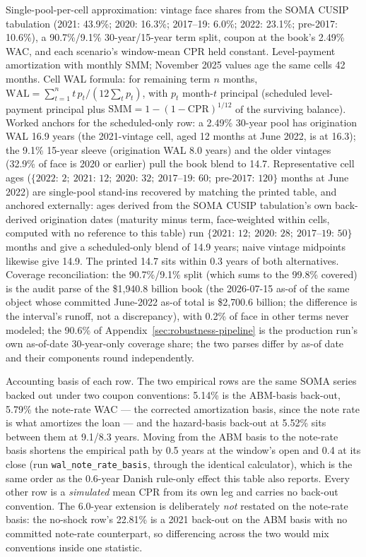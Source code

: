 \begin{table}[H]
\begin{threeparttable}
\begin{tablenotes}[flushleft]
\item Single-pool-per-cell approximation: vintage face shares from the SOMA CUSIP tabulation (2021: 43.9\%; 2020: 16.3\%; 2017--19: 6.0\%; 2022: 23.1\%; pre-2017: 10.6\%), a 90.7\%/9.1\% 30-year/15-year term split, coupon at the book's 2.49\% WAC, and each scenario's window-mean CPR held constant. Level-payment amortization with monthly SMM; November 2025 values age the same cells 42 months. Cell WAL formula: for remaining term $n$ months, $\mathrm{WAL} = \sum_{t=1}^{n} t\, p_t / (12 \sum_{t} p_t)$, with $p_t$ month-$t$ principal (scheduled level-payment principal plus $\mathrm{SMM} = 1-(1-\mathrm{CPR})^{1/12}$ of the surviving balance). Worked anchors for the scheduled-only row: a 2.49\% 30-year pool has origination WAL 16.9 years (the 2021-vintage cell, aged 12 months at June 2022, is at 16.3); the 9.1\% 15-year sleeve (origination WAL 8.0 years) and the older vintages (32.9\% of face is 2020 or earlier) pull the book blend to 14.7. Representative cell ages ($\{2022{:}\,2;\ 2021{:}\,12;\ 2020{:}\,32;\ 2017\text{--}19{:}\,60;\ \text{pre-}2017{:}\,120\}$ months at June 2022) are single-pool stand-ins recovered by matching the printed table, and anchored externally: ages derived from the SOMA CUSIP tabulation's own back-derived origination dates (maturity minus term, face-weighted within cells, computed with no reference to this table) run $\{2021{:}\,12;\ 2020{:}\,28;\ 2017\text{--}19{:}\,50\}$ months and give a scheduled-only blend of 14.9 years; naive vintage midpoints likewise give 14.9. The printed 14.7 sits within 0.3 years of both alternatives. Coverage reconciliation: the 90.7\%/9.1\% split (which sums to the 99.8\% covered) is the audit parse of the \$1{,}940.8 billion book (the 2026-07-15 as-of of the same object whose committed June-2022 as-of total is \$2{,}700.6 billion; the difference is the interval's runoff, not a discrepancy), with 0.2\% of face in other terms never modeled; the 90.6\% of Appendix~\ref{sec:robustness-pipeline} is the production run's own as-of-date 30-year-only coverage share; the two parses differ by as-of date and their components round independently.
\item Accounting basis of each row. The two empirical rows are the same SOMA series backed out under two coupon conventions: 5.14\% is the ABM-basis back-out, 5.79\% the note-rate WAC --- the corrected amortization basis, since the note rate is what amortizes the loan --- and the hazard-basis back-out at 5.52\% sits between them at 9.1/8.3 years. Moving from the ABM basis to the note-rate basis shortens the empirical path by 0.5 years at the window's open and 0.4 at its close (run \texttt{wal\_note\_rate\_basis}, through the identical calculator), which is the same order as the 0.6-year Danish rule-only effect this table also reports. Every other row is a \emph{simulated} mean CPR from its own leg and carries no back-out convention. The 6.0-year extension is deliberately \emph{not} restated on the note-rate basis: the no-shock row's 22.81\% is a 2021 back-out on the ABM basis with no committed note-rate counterpart, so differencing across the two would mix conventions inside one statistic.

\end{tablenotes}
\end{threeparttable}
\end{table}
